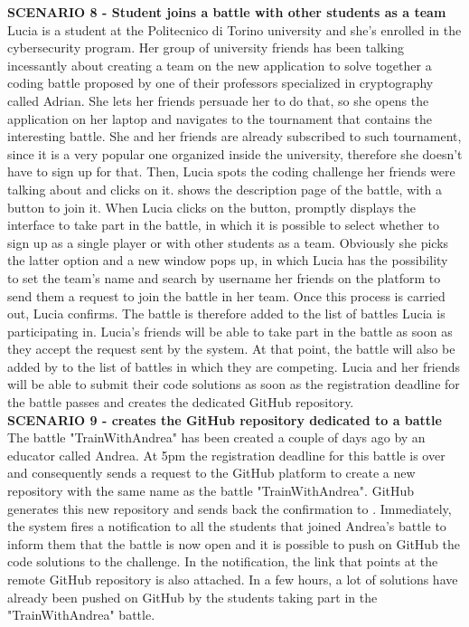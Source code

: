     \textbf{SCENARIO 8 - Student joins a battle with other students as a team}\\
    Lucia is a student at the Politecnico di Torino university and she's enrolled in the cybersecurity program. Her group of university friends has been talking incessantly about creating a team on the new \app application to solve together a coding battle proposed by one of their professors specialized in cryptography called Adrian. She lets her friends persuade her to do that, so she opens the \app application on her laptop and navigates to the tournament that contains the interesting battle. She and her friends are already subscribed to such tournament, since it is a very popular one organized inside the university, therefore she doesn't have to sign up for that. Then, Lucia spots the coding challenge her friends were talking about and clicks on it. \app shows the description page of the battle, with a button to join it. When Lucia clicks on the button, \app promptly displays the interface to take part in the battle, in which it is possible to select whether to sign up as a single player or with other students as a team. Obviously she picks the latter option and a new window pops up, in which Lucia has the possibility to set the team's name and search by username her friends on the platform to send them a request to join the battle in her team. Once this process is carried out, Lucia confirms. The battle is therefore added to the list of battles Lucia is participating in.
    Lucia's friends will be able to take part in the battle as soon as they accept the request sent by the system. At that point, the battle will also be added by \app to the list of battles in which they are competing.
    Lucia and her friends will be able to submit their code solutions as soon as the registration deadline for the battle passes and \app creates the dedicated GitHub repository.\\
    
    \textbf{SCENARIO 9 - \app creates the GitHub repository dedicated to a battle}\\
     The battle "TrainWithAndrea" has been created a couple of days ago by an educator called Andrea. At 5pm the registration deadline for this battle is over and consequently \app sends a request to the GitHub platform to create a new repository with the same name as the battle "TrainWithAndrea". GitHub generates this new repository and sends back the confirmation to \app. Immediately, the system fires a notification to all the students that joined Andrea's battle to inform them that the battle is now open and it is possible to push on GitHub the code solutions to the challenge. In the notification, the link that points at the remote GitHub repository is also attached. In a few hours, a lot of solutions have already been pushed on GitHub by the students taking part in the "TrainWithAndrea" battle.\\
    
